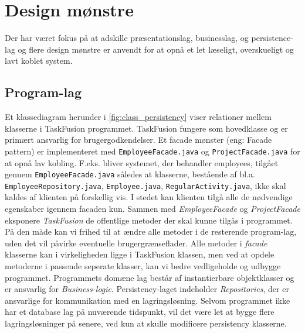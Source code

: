\section{Design mønstre}
Der har været fokus på at adskille præsentationslag, businesslag, og persistence-lag og flere design mønstre er anvendt for at opnå et let læseligt, overskueligt og lavt koblet system. 

\subsection{Program-lag}
Et klassediagram herunder i \ref{fig:class_persistency} viser relationer mellem klasserne i TaskFusion programmet. TaskFusion fungere som hovedklasse og er primært ansvarlig for brugergodkendelser. Et facade mønster (eng: Facade pattern) er implementeret med \texttt{EmployeeFacade.java} og \texttt{ProjectFacade.java} for at opnå lav kobling. F.eks. bliver systemet, der behandler employees, tilgået gennem \texttt{EmployeeFacade.java} således at klasserne, bestående af bl.a. \texttt{EmployeeRepository.java}, \texttt{Employee.java}, \texttt{RegularActivity.java}, ikke skal kaldes af klienten på forskellig vis. I stedet kan klienten tilgå alle de nødvendige egenskaber igennem facaden kun. Sammen med \textit{EmployeeFacade} og \textit{ProjectFacade} eksponere \textit{TaskFusion} de offentlige metoder der skal kunne tilgås i programmet. På den måde kan vi frihed til at ændre alle metoder i de resterende program-lag, uden det vil påvirke eventuelle brugergrænseflader. Alle metoder i \textit{facade} klasserne kan i virkeligheden ligge i TaskFusion klassen, men ved at opdele metoderne i passende seperate klasser, kan vi bedre vedligeholde og udbygge programmet. 
Programmets domæne lag består af instantierbare objektklasser og er ansvarlig for \textit{Business-logic}. Persistency-laget indeholder \textit{Repositories}, der er ansvarlige for kommunikation med en lagringsløsning. Selvom programmet ikke har et database lag på nuværende tidspunkt, vil det være let at bygge flere lagringsløsninger på senere, ved kun at skulle modificere persistency klasserne. 

